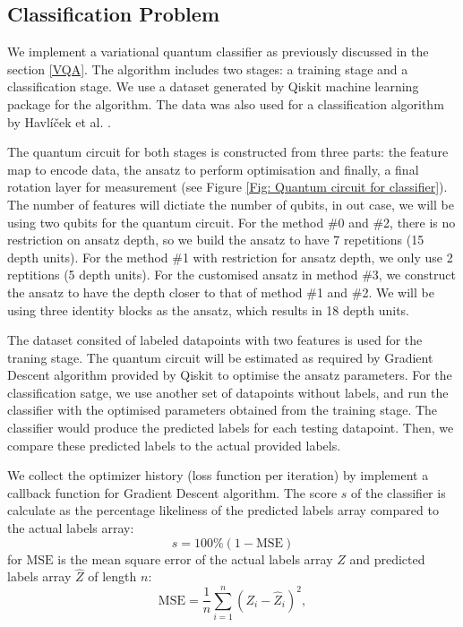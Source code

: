 \subsection{Classification Problem} \label{Sec: Classification Problem}
We implement a variational quantum classifier as previously discussed in the section \ref{VQA}.
The algorithm includes two stages: a training stage and a classification stage.
We use a dataset generated by Qiskit machine learning package for the algorithm.
The data was also used for a classification algorithm by Havlíček et al. \cite{havlicekSupervisedLearningQuantumenhanced2019}.

The quantum circuit for both stages is constructed from three parts: the feature map to encode data, the ansatz to perform optimisation and finally, a final rotation layer for measurement (see Figure \ref{Fig: Quantum circuit for classifier}).
The number of features will dictiate the number of qubits, in out case, we will be using two qubits for the quantum circuit.
For the method \#0 and \#2, there is no restriction on ansatz depth, so we build the ansatz to have 7 repetitions (15 depth units).
For the method \#1 with restriction for ansatz depth, we only use 2 reptitions (5 depth units).
For the customised ansatz in method \#3, we construct the ansatz to have the depth closer to that of method \#1 and \#2. We will be using three identity blocks as the ansatz, which results in 18 depth units.

The dataset consited of labeled datapoints with two features is used for the traning stage.
The quantum circuit will be estimated as required by Gradient Descent algorithm provided by Qiskit to optimise the ansatz parameters.
For the classification satge, we use another set of datapoints without labels, and run the classifier with the optimised parameters obtained from the training stage.
The classifier would produce the predicted labels for each testing datapoint.
Then, we compare these predicted labels to the actual provided labels.

We collect the optimizer history (loss function per iteration) by implement a callback function for Gradient Descent algorithm.
The score $s$ of the classifier is calculate as the percentage likeliness of the predicted labels array compared to the actual labels array:
\begin{equation}
    s = 100\% (1 - \text{MSE})
\end{equation}
for $\text{MSE}$ is the mean square error of the actual labels array $Z$ and predicted labels array $\hat{Z}$ of length $n$:
\begin{equation}
    \text{MSE} = \frac{1}{n}\sum^n_{i=1}(Z_i - \hat{Z}_i)^2,
\end{equation}



